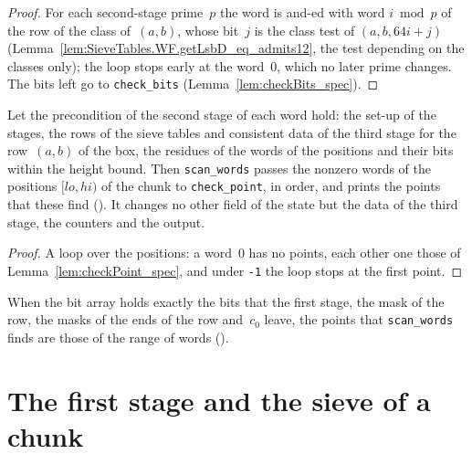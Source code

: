 \begin{proof}
  \leanok
  For each second-stage prime~$p$ the word is and-ed with word $i \bmod p$ of the row of the class
  of~$(a, b)$, whose bit~$j$ is the class test of $(a, b, 64 i + j)$
  (Lemma~\ref{lem:SieveTables.WF.getLsbD_eq_admits12}, the test depending on the classes only); the
  loop stops early at the word~$0$, which no later prime changes. The bits left go to
  \texttt{check\_bits} (Lemma~\ref{lem:checkBits_spec}).
\end{proof}

\begin{lemma}\label{lem:scanWords_spec}
  \leanok
  Let the precondition  of the second stage of each word hold: the set-up of
  the stages, the rows of the sieve tables and consistent data of the third stage for the
  row~$(a, b)$ of the box, the residues of the words of the positions and their bits within the height
  bound. Then \texttt{scan\_words} passes the nonzero words of the positions $[lo, hi)$ of the chunk
  to \texttt{check\_point}, in order, and prints the points that these find
  (). It changes no other field of the state but the data of the third
  stage, the counters and the output.
\end{lemma}

\begin{proof}
  \leanok
  A loop over the positions: a word~$0$ has no points, each other one those of
  Lemma~\ref{lem:checkPoint_spec}, and under \texttt{-1} the loop stops at the first point.
\end{proof}

When the bit array holds exactly the bits that the first stage, the mask of the row, the masks of
the ends of the row and~$c_0$ leave, the points that \texttt{scan\_words} finds are those of the
range of words ().

\section{The first stage and the sieve of a chunk}\label{sec:stage1}

